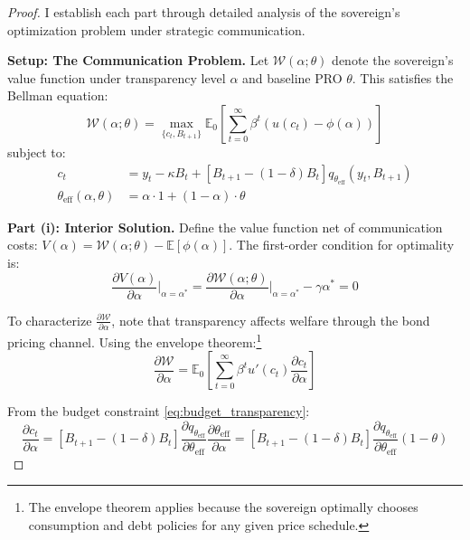 \documentclass[12pt]{article}
\theoremstyle{plain}
\begin{document}
\begin{proof}
I establish each part through detailed analysis of the sovereign's optimization problem under strategic communication.

	\textbf{Setup: The Communication Problem.}
	Let $\mathcal{W}(\alpha; \theta)$ denote the sovereign's value function under transparency level $\alpha$ and baseline PRO $\theta$. This satisfies the Bellman equation:
	\begin{equation}
		\mathcal{W}(\alpha; \theta) = \max_{\{c_t, B_{t+1}\}} \mathbb{E}_0 \left[ \sum_{t=0}^\infty \beta^t \left( u(c_t) - \phi(\alpha) \right) \right] \label{eq:welfare_transparency}
	\end{equation}
	subject to:
	\begin{align}
		c_t                                 & = y_t - \kappa B_t + [B_{t+1} - (1-\delta)B_t] q_{\theta_{\text{eff}}}(y_t, B_{t+1}) \label{eq:budget_transparency} \\
		\theta_{\text{eff}}(\alpha, \theta) & = \alpha \cdot 1 + (1-\alpha) \cdot \theta \label{eq:effective_theta_proof}
	\end{align}

	\textbf{Part (i): Interior Solution.}
	Define the value function net of communication costs: $V(\alpha) = \mathcal{W}(\alpha; \theta) - \mathbb{E}[\phi(\alpha)]$. The first-order condition for optimality is:
	\begin{equation}
		\frac{\partial V(\alpha)}{\partial \alpha}\bigg|_{\alpha=\alpha^*} = \frac{\partial \mathcal{W}(\alpha; \theta)}{\partial \alpha}\bigg|_{\alpha=\alpha^*} - \gamma \alpha^* = 0 \label{eq:foc_detailed}
	\end{equation}

	To characterize $\frac{\partial \mathcal{W}}{\partial \alpha}$, note that
	transparency affects welfare through the bond pricing channel. Using the
	envelope theorem:\footnote{The envelope theorem applies because the sovereign
		optimally chooses consumption and debt policies for any given price schedule.}
	\begin{equation}
		\frac{\partial \mathcal{W}}{\partial \alpha} = \mathbb{E}_0 \left[ \sum_{t=0}^\infty \beta^t u'(c_t) \frac{\partial c_t}{\partial \alpha} \right] \label{eq:welfare_derivative}
	\end{equation}

	From the budget constraint \eqref{eq:budget_transparency}:
	\begin{equation}
		\frac{\partial c_t}{\partial \alpha} = [B_{t+1} - (1-\delta)B_t] \frac{\partial q_{\theta_{\text{eff}}}}{\partial \theta_{\text{eff}}} \frac{\partial \theta_{\text{eff}}}{\partial \alpha} = [B_{t+1} - (1-\delta)B_t] \frac{\partial q_{\theta_{\text{eff}}}}{\partial \theta_{\text{eff}}} (1-\theta) \label{eq:consumption_derivative_alpha}
	\end{equation}


\end{proof}
\end{document}
